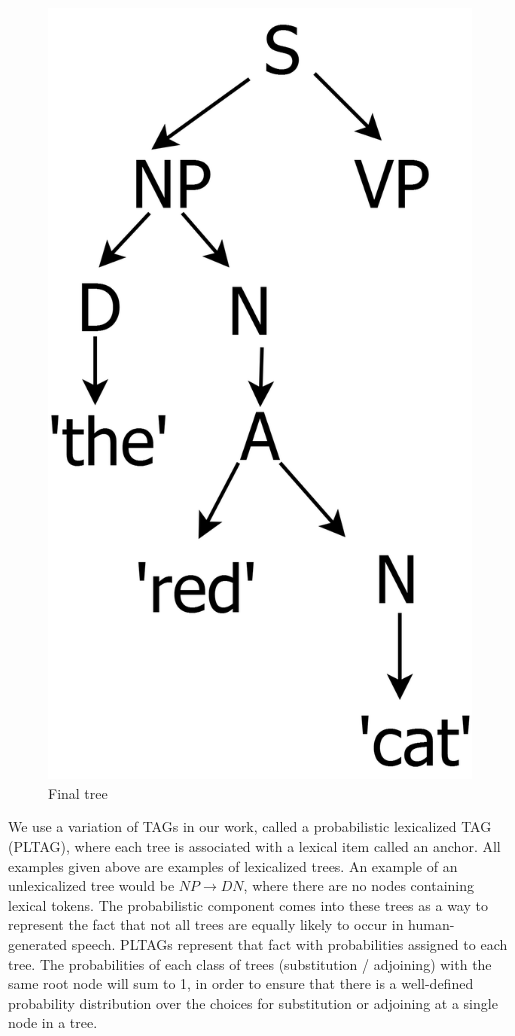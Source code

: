 \begin{figure}[ht]
\begin{minipage}[b]{0.3\linewidth}
\includegraphics[width=\linewidth]{tree-3.png}
\caption{Final tree}
\label{tree-3}
\end{minipage}
\end{figure}

We use a variation of TAGs in our work, called a probabilistic lexicalized TAG (PLTAG), where each tree is
associated with a lexical item called an anchor.  All examples given above are examples of
lexicalized trees.  An example of an unlexicalized tree would be $NP \rightarrow D N$, where there
are no nodes containing lexical tokens.  The probabilistic component comes into these trees
as a way to represent the fact that not all trees are equally likely to occur in human-generated speech.
PLTAGs represent that fact with probabilities assigned to each tree.
The probabilities of each class of trees (substitution / adjoining) with the same root node
will sum to 1, in order to ensure that there is a well-defined probability distribution
over the choices for substitution or adjoining at a single node in a tree.